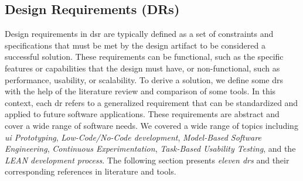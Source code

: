 \subsection{Design Requirements (DRs)}
\label{design:section:designReqs}
Design requirements in \ac{dsr} are typically defined as a set of constraints and specifications that must be met by the design artifact to be considered a successful solution. 
These requirements can be functional, such as the specific features or capabilities that the design must have, or non-functional, such as performance, usability, or scalability.
To derive a solution, we define some \ac{dr}s with the help of the literature review and comparison of some tools.
In this context, each \ac{dr} refers to a generalized requirement that can be standardized and applied to future software applications. 
These requirements are abstract and cover a wide range of software needs.
We covered a wide range of topics including \textit{\ac{ui} Prototyping}, \textit{Low-Code/No-Code development}, \textit{Model-Based Software Engineering}, \textit{Continuous Experimentation}, \textit{Task-Based Usability Testing}, and the \textit{LEAN development process}.
The following section presents \textit{eleven \ac{dr}s} and their corresponding references in literature and tools.


